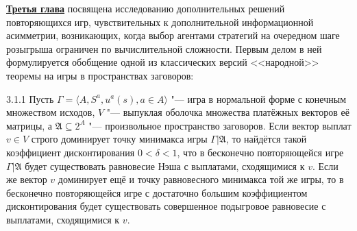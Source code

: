 \underline{\textbf{Третья глава}} посвящена исследованию дополнительных решений повторяющихся игр, чувствительных к дополнительной информационной асимметрии, возникающих, когда выбор агентами стратегий на очередном шаге розыгрыша ограничен по вычислительной сложности. Первым делом в ней формулируется обобщение одной из классических версий <<народной>> теоремы на игры в пространствах заговоров:
\begin{theorem}{3.1.1}
	Пусть $\Gamma = \langle A, S^a, u^a(s), a \in A \rangle$ "--- игра в нормальной форме с конечным множеством исходов, $V$ "--- выпуклая оболочка множества платёжных векторов её матрицы, а $\mathfrak{A} \subseteq 2^A$ "--- произвольное пространство заговоров. Если вектор выплат $v \in V$ строго доминирует точку минимакса игры $\Gamma | \mathfrak{A}$, то найдётся такой коэффициент дисконтирования $0 < \delta < 1$, что в бесконечно повторяющейся игре $\Gamma | \mathfrak{A}$ будет существовать равновесие Нэша с выплатами, сходящимися к $v$. Если же вектор $v$ доминирует ещё и точку равновесного минимакса той же игры, то в бесконечно повторяющейся игре с достаточно большим коэффициентом дисконтирования будет существовать совершенное подыгровое равновесие с выплатами, сходящимися к $v$.
\end{theorem}

